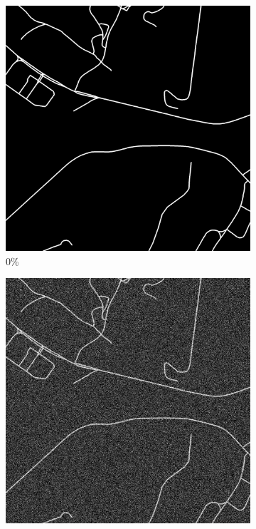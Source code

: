 \begin{figure}[!b]
\begin{subfigure}{0.31\textwidth}
\includegraphics[width=\linewidth]{figs/E8/flipping/noise0.png}
\caption{0\%}
\end{subfigure}
\hspace*{\fill} %
\begin{subfigure}{0.31\textwidth}
\includegraphics[width=\linewidth]{figs/E8/flipping/noise2.png}

\end{subfigure}
\end{figure}
